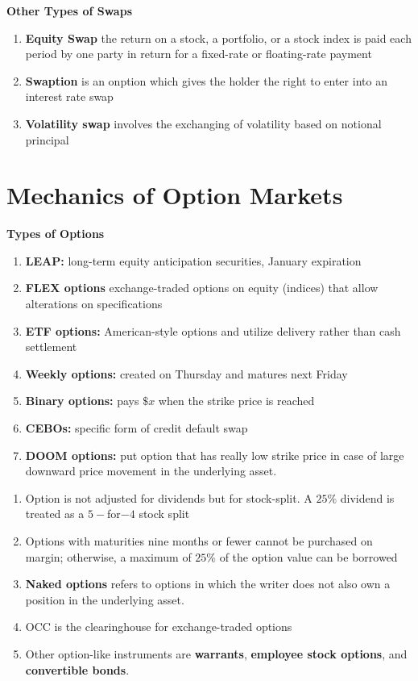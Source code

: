\documentclass[11pt,fleqn]{book} %
\numberwithin{equation}{section} %
\numberwithin{figure}{section} %
\numberwithin{table}{section} %
\begin{document}
\begin{definition}\textbf{Other Types of Swaps}
\begin{enumerate}
    \item \textbf{Equity Swap} the return on a stock, a portfolio, or a stock index is paid each period by one party in return for a fixed-rate or floating-rate payment
    \item \textbf{Swaption} is an onption which gives the holder the right to enter into an interest rate swap
    \item \textbf{Volatility swap} involves the exchanging of volatility based on notional principal
\end{enumerate}
\end{definition}
\chapter{Mechanics of Option Markets}
\begin{definition}\textbf{Types of Options}
\begin{enumerate}
    \item \textbf{LEAP:} long-term equity anticipation securities, January expiration 
    \item \textbf{FLEX options} exchange-traded options on equity (indices) that allow alterations on specifications
    \item \textbf{ETF options:} American-style options and utilize delivery rather than cash settlement
    \item \textbf{Weekly options:} created on Thursday and matures next Friday
    \item \textbf{Binary options:} pays $\$x$ when the strike price is reached
    \item \textbf{CEBOs:} specific form of credit default swap
    \item \textbf{DOOM options:} put option that has really low strike price in case of large downward price movement in the underlying asset.
\end{enumerate}
\end{definition}
\begin{remark}
\begin{enumerate}
    \item Option is not adjusted for dividends but for stock-split. A $25\%$ dividend is treated as a $5-$for$-4$ stock split
    \item Options with maturities nine months or fewer cannot be purchased on margin; otherwise, a maximum of $25\%$ of the option value can be borrowed
    \item \textbf{Naked options} refers to options in which the writer does not also own a position in the underlying asset.
    \item OCC is the clearinghouse for exchange-traded options
    \item Other option-like instruments are \textbf{warrants}, \textbf{employee stock options}, and \textbf{convertible bonds}.
\end{enumerate}

\end{remark}
\end{document}
